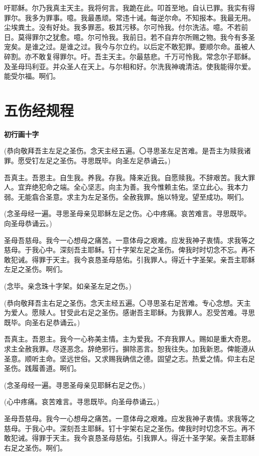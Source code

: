 \documentclass[UTF8,17pt]{ctexart}
\begin{document}
吁耶稣。尔乃我真主天主。我将何⾔。我跪在此。叩⾸⾄地。⾃认已罪。我实有得罪尔。我多为罪事。噫。我最愚顽。常违⼗诫。每逆尔命。不知报本。我最⽆⽤。尘埃粪⼟。没有好处。我多罪恶。极其污移。尔可怜我。付尔洗洁。噫。不若前⽇。莫得罪尔之犹愈。噫。尔可怜我。我前⽇。若不⾃弃尔所赐之物。我今有多圣宠矣。是谁之过。是谁之过。我今与尔⽴约。以后定不敢犯罪。要顺尔命。虽被⼈碎割。亦不敢复得罪尔。吁。吾主天主。尔最慈悲。千万可怜我。常念尔⼦耶稣。及圣母玛利亚。并众圣⼈在天上。与尔相和好。尔洗我神魂清洁。使我能得尔爱。能受尔福。啊们。

\section{五伤经规程}

\textbf{初行画十字}

(恭向敬拜吾主左⾜之圣伤。念天主经五遍。〇寻思圣左⾜苦难。是吾主为赎我诸罪。愿受钉左⾜之圣伤。寻思既毕。向圣左⾜恭诵云。)

吾真主。吾恩主。⾃⽣我。养我。存我。降来近我。⾃愿赎我。不辞艰苦。我⼤罪人。宜弃绝犯命之端。全⼼坚志。向主为善。我今惟赖主佑。坚⽴此⼼。我本⼒弱。⽆能翕合圣意。求主为左⾜圣伤。全赦我罪。施以特宠。望⾄成功。啊们。

(念圣母经⼀遍。寻思圣母亲见耶稣左⾜之伤。⼼中疼痛。哀苦难⾔。寻思既毕。向圣母恭诵云。)

圣母吾慈母。我今⼀⼼想母之痛苦。⼀意体母之艰难。应发我神⼦衷情。求我等之慈母。于我⼼中。深刻吾主耶稣。钉⼗字架左⾜之圣伤。俾我时时切念不忘。再不敢犯诫。得罪于天主。我今哀恳圣母慈佑。引我罪⼈。得近⼗字圣架。亲吾主耶稣左⾜之圣伤。啊们。

(念毕。亲念珠⼗字架。如亲圣左⾜之伤。)

(恭向敬拜吾主右⾜之圣伤。念天主经五遍。〇寻思圣右⾜苦难。专⼼念想。天主为爱⼈。愿赎⼈。⽢受此右⾜之圣伤。感谢吾主耶稣。为我罪⼈。忍受苦难。寻思既毕。向圣右⾜恭诵云。)

吾真主。吾恩主。我今⼀⼼称美主情。主为爱我。不弃我罪⼈。赐如是重⼤奇恩。求主全赦我罪。尽逐恶念。辞绝邪⾏。摒除恶⾔。恕我往失。加我新恩。俾能遵从圣意。顺听主命。坚远世俗。又求赐我确信之德。固望之志。热爱之情。仰主右⾜圣伤。践履善道。啊们。

(念圣母经⼀遍。寻思圣母亲见耶稣右⾜之伤。)

(⼼中疼痛。哀苦难⾔。寻思既毕。向圣母恭诵云。)

圣母吾慈母。我今⼀⼼想母之痛苦。⼀意体母之艰难。应发我神⼦衷情。求我等之慈母。于我⼼中。深刻吾主耶稣。钉⼗宇架右⾜之圣伤。俾我时时切念不忘。再不敢犯诫。得罪于天主。我今哀恳圣母慈佑。引我罪⼈。得近⼗圣字架。亲吾主耶稣右⾜之圣伤。啊们。
\end{document}

